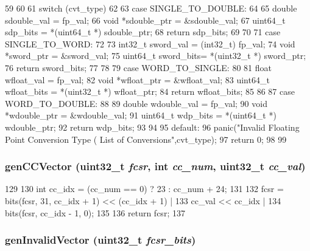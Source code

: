 \begin{DoxyCode}
59 {
60 
61     switch (cvt_type)
62     {
63       case SINGLE_TO_DOUBLE:
64         {
65             double sdouble_val = fp_val;
66             void  *sdouble_ptr = &sdouble_val;
67             uint64_t sdp_bits  = *(uint64_t *) sdouble_ptr;
68             return sdp_bits;
69         }
70 
71       case SINGLE_TO_WORD:
72         {
73             int32_t sword_val  = (int32_t) fp_val;
74             void  *sword_ptr   = &sword_val;
75             uint64_t sword_bits= *(uint32_t *) sword_ptr;
76             return sword_bits;
77         }
78 
79       case WORD_TO_SINGLE:
80         {
81             float wfloat_val   = fp_val;
82             void  *wfloat_ptr  = &wfloat_val;
83             uint64_t wfloat_bits = *(uint32_t *) wfloat_ptr;
84             return wfloat_bits;
85         }
86 
87       case WORD_TO_DOUBLE:
88         {
89             double wdouble_val = fp_val;
90             void  *wdouble_ptr = &wdouble_val;
91             uint64_t wdp_bits  = *(uint64_t *) wdouble_ptr;
92             return wdp_bits;
93         }
94 
95       default:
96         panic("Invalid Floating Point Conversion Type (%
      List of Conversions\n",cvt_type);
97         return 0;
98     }
99 }
\end{DoxyCode}
\hypertarget{namespaceMipsISA_ab28e8a16ffbefccfa65df228a13bbfe2}{
\subsubsection[{genCCVector}]{ genCCVector ({\bf uint32\_\-t} {\em fcsr}, \/  int {\em cc\_\-num}, \/  {\bf uint32\_\-t} {\em cc\_\-val})}}
\label{namespaceMipsISA_ab28e8a16ffbefccfa65df228a13bbfe2}



\begin{DoxyCode}
129 {
130     int cc_idx = (cc_num == 0) ? 23 : cc_num + 24;
131 
132     fcsr = bits(fcsr, 31, cc_idx + 1) << (cc_idx + 1) |
133            cc_val << cc_idx |
134            bits(fcsr, cc_idx - 1, 0);
135 
136     return fcsr;
137 }
\end{DoxyCode}
\hypertarget{namespaceMipsISA_ac248600d7063a3175e01d23e0341ed2f}{
\subsubsection[{genInvalidVector}]{ genInvalidVector ({\bf uint32\_\-t} {\em fcsr\_\-bits})}}
\label{namespaceMipsISA_ac248600d7063a3175e01d23e0341ed2f}



